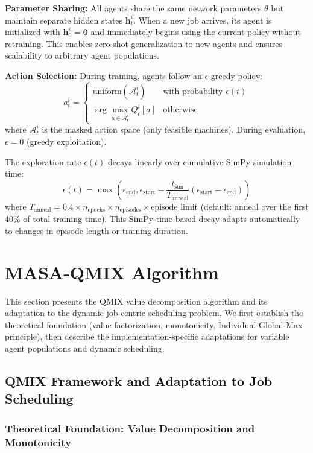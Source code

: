 \textbf{Parameter Sharing:} All agents share the same network parameters \(\theta\) but maintain separate hidden states \(\mathbf{h}_t^i\). When a new job arrives, its agent is initialized with \(\mathbf{h}_0^i = \mathbf{0}\) and immediately begins using the current policy without retraining. This enables zero-shot generalization to new agents and ensures scalability to arbitrary agent populations.

\textbf{Action Selection:} During training, agents follow an \(\epsilon\)-greedy policy:
\[
a_t^i = 
\begin{cases}
\text{uniform}(\mathcal{A}_t^i) & \text{with probability } \epsilon(t) \\
\arg\max_{a \in \mathcal{A}_t^i} Q_t^i[a] & \text{otherwise}
\end{cases}
\]
where \(\mathcal{A}_t^i\) is the masked action space (only feasible machines). During evaluation, \(\epsilon = 0\) (greedy exploitation).

The exploration rate \(\epsilon(t)\) decays linearly over cumulative SimPy simulation time:
\[
\epsilon(t) = \max\left(\epsilon_{\text{end}}, \epsilon_{\text{start}} - \frac{t_{\text{sim}}}{T_{\text{anneal}}} (\epsilon_{\text{start}} - \epsilon_{\text{end}})\right)
\]
where \(T_{\text{anneal}} = 0.4 \times n_{\text{epochs}} \times n_{\text{episodes}} \times \text{episode\_limit}\) (default: anneal over the first 40\% of total training time). This SimPy-time-based decay adapts automatically to changes in episode length or training duration.

\section{MASA-QMIX Algorithm}
\label{sec:masaqmix}

This section presents the QMIX value decomposition algorithm and its adaptation to the dynamic job-centric scheduling problem. We first establish the theoretical foundation (value factorization, monotonicity, Individual-Global-Max principle), then describe the implementation-specific adaptations for variable agent populations and dynamic scheduling.

\subsection{QMIX Framework and Adaptation to Job Scheduling}
\label{sec:qmix_framework}

\subsubsection{Theoretical Foundation: Value Decomposition and Monotonicity}

